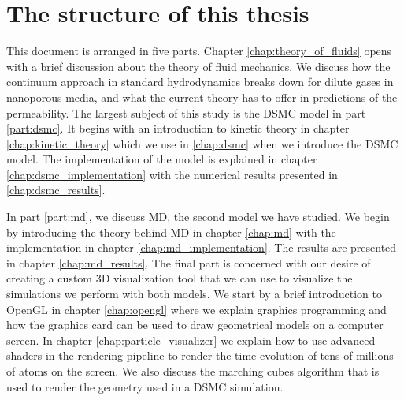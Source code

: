 \section{The structure of this thesis}
\label{sec:structure}
This document is arranged in five parts. Chapter \ref{chap:theory_of_fluids} opens with a brief discussion about the theory of fluid mechanics. We discuss how the continuum approach in standard hydrodynamics breaks down for dilute gases in nanoporous media, and what the current theory has to offer in predictions of the permeability. The largest subject of this study is the DSMC model in part \ref{part:dsmc}. It begins with an introduction to kinetic theory in chapter \ref{chap:kinetic_theory} which we use in \ref{chap:dsmc} when we introduce the DSMC model. The implementation of the model is explained in chapter \ref{chap:dsmc_implementation} with the numerical results presented in \ref{chap:dsmc_results}.

In part \ref{part:md}, we discuss MD, the second model we have studied. We begin by introducing the theory behind MD in chapter \ref{chap:md} with the implementation in chapter \ref{chap:md_implementation}. The results are presented in chapter \ref{chap:md_results}. The final part is concerned with our desire of creating a custom 3D visualization tool that we can use to visualize the simulations we perform with both models. We start by a brief introduction to OpenGL in chapter \ref{chap:opengl} where we explain graphics programming and how the graphics card can be used to draw geometrical models on a computer screen. In chapter \ref{chap:particle_visualizer} we explain how to use advanced shaders in the rendering pipeline to render the time evolution of tens of millions of atoms on the screen. We also discuss the marching cubes algorithm that is used to render the geometry used in a DSMC simulation.